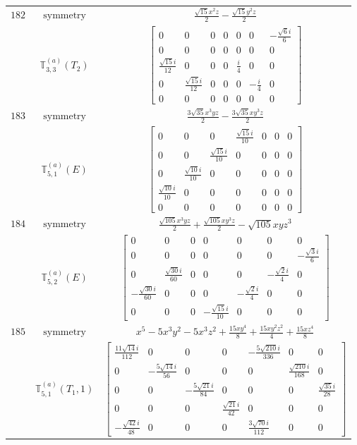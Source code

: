 \documentclass[fleqn,8pt,landscape]{jsarticle}
\begin{document}
\begin{longtable}{ccc}
$ 182 $ & $ \text{symmetry} $ & $ \frac{\sqrt{15} x^{2} z}{2} - \frac{\sqrt{15} y^{2} z}{2} $ \\
$  $ & $ \mathbb{T}_{3,3}^{(a)}(T_{2}) $ & $ \begin{bmatrix} 0 & 0 & 0 & 0 & 0 & 0 & - \frac{\sqrt{6} i}{6} \\ 0 & 0 & 0 & 0 & 0 & 0 & 0 \\ \frac{\sqrt{15} i}{12} & 0 & 0 & 0 & \frac{i}{4} & 0 & 0 \\ 0 & \frac{\sqrt{15} i}{12} & 0 & 0 & 0 & - \frac{i}{4} & 0 \\ 0 & 0 & 0 & 0 & 0 & 0 & 0 \end{bmatrix} $ \\ \hline
$ 183 $ & $ \text{symmetry} $ & $ \frac{3 \sqrt{35} x^{3} y z}{2} - \frac{3 \sqrt{35} x y^{3} z}{2} $ \\
$  $ & $ \mathbb{T}_{5,1}^{(a)}(E) $ & $ \begin{bmatrix} 0 & 0 & 0 & \frac{\sqrt{15} i}{10} & 0 & 0 & 0 \\ 0 & 0 & \frac{\sqrt{15} i}{10} & 0 & 0 & 0 & 0 \\ 0 & \frac{\sqrt{10} i}{10} & 0 & 0 & 0 & 0 & 0 \\ \frac{\sqrt{10} i}{10} & 0 & 0 & 0 & 0 & 0 & 0 \\ 0 & 0 & 0 & 0 & 0 & 0 & 0 \end{bmatrix} $ \\ \hline
$ 184 $ & $ \text{symmetry} $ & $ \frac{\sqrt{105} x^{3} y z}{2} + \frac{\sqrt{105} x y^{3} z}{2} - \sqrt{105} x y z^{3} $ \\
$  $ & $ \mathbb{T}_{5,2}^{(a)}(E) $ & $ \begin{bmatrix} 0 & 0 & 0 & 0 & 0 & 0 & 0 \\ 0 & 0 & 0 & 0 & 0 & 0 & - \frac{\sqrt{3} i}{6} \\ 0 & \frac{\sqrt{30} i}{60} & 0 & 0 & 0 & - \frac{\sqrt{2} i}{4} & 0 \\ - \frac{\sqrt{30} i}{60} & 0 & 0 & 0 & - \frac{\sqrt{2} i}{4} & 0 & 0 \\ 0 & 0 & 0 & - \frac{\sqrt{15} i}{10} & 0 & 0 & 0 \end{bmatrix} $ \\ \hline
$ 185 $ & $ \text{symmetry} $ & $ x^{5} - 5 x^{3} y^{2} - 5 x^{3} z^{2} + \frac{15 x y^{4}}{8} + \frac{15 x y^{2} z^{2}}{4} + \frac{15 x z^{4}}{8} $ \\
$  $ & $ \mathbb{T}_{5,1}^{(a)}(T_{1},1) $ & $ \begin{bmatrix} \frac{11 \sqrt{14} i}{112} & 0 & 0 & 0 & - \frac{5 \sqrt{210} i}{336} & 0 & 0 \\ 0 & - \frac{5 \sqrt{14} i}{56} & 0 & 0 & 0 & \frac{\sqrt{210} i}{168} & 0 \\ 0 & 0 & - \frac{5 \sqrt{21} i}{84} & 0 & 0 & 0 & \frac{\sqrt{35} i}{28} \\ 0 & 0 & 0 & \frac{\sqrt{21} i}{42} & 0 & 0 & 0 \\ - \frac{\sqrt{42} i}{48} & 0 & 0 & 0 & \frac{3 \sqrt{70} i}{112} & 0 & 0 \end{bmatrix} $ \\ \hline

\end{longtable}
\end{document}
